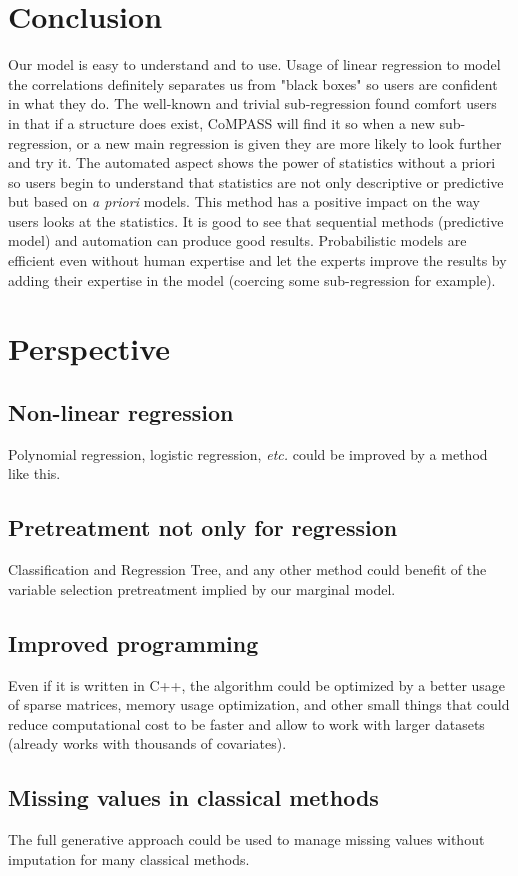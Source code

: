 \documentclass[12pt,a4paper]{report}
\begin{document}
	\section{Conclusion}
		Our model is easy to understand and to use. Usage of linear regression to model the correlations definitely separates us from "black boxes" so users are confident in what they do. The well-known and trivial sub-regression found comfort users in that if a structure does exist, CoMPASS will find it so when a new sub-regression, or a new main regression is given they are more likely to look further and try it. The automated aspect shows the power of statistics without a priori so users begin to understand that statistics are not only descriptive or predictive but based on {\it a priori} models. This method has a positive impact on the way users looks at the statistics.
			It is good to see that sequential methods (predictive model) and automation can produce good results. Probabilistic models are efficient even without human expertise and let the experts improve the results by adding their expertise in the model (coercing some sub-regression for example).
		
		
	\section{Perspective}
		\subsection{Non-linear regression}
			Polynomial regression, logistic regression, {\it etc.} could be improved by a method like this.
		\subsection{Pretreatment not only for regression}
			Classification and Regression Tree, and any other method could benefit of the variable selection pretreatment implied by our marginal model.
		\subsection{Improved programming}
			Even if it is written in C++, the algorithm could be optimized by a better usage of sparse matrices, memory usage optimization, and other small things that could reduce computational cost to be faster and allow to work with larger datasets (already works with thousands of covariates).
		\subsection{Missing values in classical methods}
			The full generative approach could be used to manage missing values without imputation for many classical methods.
\end{document}

